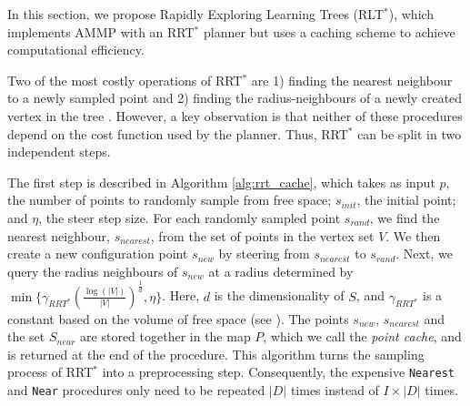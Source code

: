 \documentclass[a4paper,11pt]{report}
\begin{document}
In this section, we propose Rapidly Exploring Learning Trees (RLT$^*$), which implements AMMP with an RRT$^*$ planner but uses a caching scheme to achieve computational efficiency.

Two of the most costly operations of RRT$^*$ are 1) finding the nearest neighbour to a newly sampled point and 2) finding the radius-neighbours of a newly created vertex in the tree \cite{karaman2011sampling}. However, a key observation is that neither of these procedures depend on the cost function used by the planner. Thus,  RRT$^*$ can be split in two independent steps. 

	The first step is described in Algorithm \ref{alg:rrt_cache}, which takes as input $p$, the number of points to randomly sample from free space; $s_{init}$, the initial point; and $\eta$, the steer step size. For each randomly sampled point $s_{rand}$, we find the nearest neighbour, $s_{nearest}$, from the set of points in the vertex set $V$. We then create a new configuration point $s_{new}$ by steering from $s_{nearest}$ to $s_{rand}$. Next, we query the radius neighbours of $s_{new}$ at a radius determined by  $\min\{\gamma_{RRT^*}(\frac{\log(|V|)}{|V|})^{\frac{1}{d}},\eta\}$. Here, $d$ is the dimensionality of $S$, and $\gamma_{RRT^*}$ is a constant based on the volume of free space (see \cite{karaman2011sampling}). The points $s_{new}$, $s_{nearest}$ and the set $S_{near}$ are stored together in the map $P$, which we call the \emph{point cache}, and is returned at the end of the procedure. This algorithm turns the sampling process of RRT$^*$  into a preprocessing step. Consequently, the expensive \texttt{Nearest} and \texttt{Near} procedures only need to be repeated $|D|$ times instead of $I\times|D|$ times.
\end{document}
